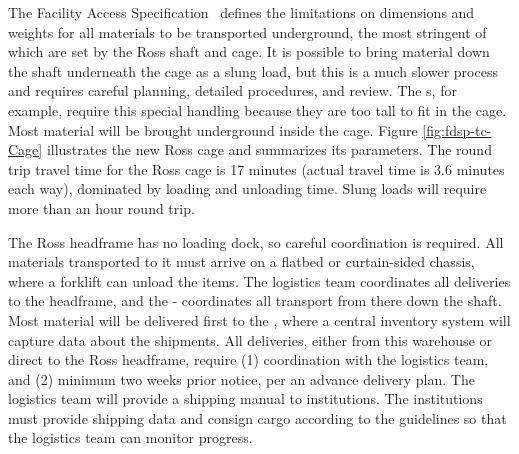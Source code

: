 The  Facility Access Specification~\cite{bib:docdb328} defines the limitations on dimensions and weights for all materials to be transported underground, the most stringent of which are set by the Ross shaft and cage. It is possible to bring material down the shaft underneath the cage as a slung load, but this is a much slower process and requires careful planning, detailed procedures, and review. The  s, for example, require this special handling because they are too tall to fit in the cage. Most material will be brought underground inside the cage. Figure \ref{fig:fdsp-tc-Cage} illustrates the new Ross cage and summarizes its parameters.  The round trip travel time for the Ross cage is 17 minutes (actual travel time is \num{3.6} minutes each way), dominated by loading and unloading time.  Slung loads will require more than an hour round trip.


The Ross headframe has no loading dock, so careful coordination is required. All materials transported to it must arrive on a flatbed or curtain-sided chassis, where a forklift can unload  the items. The logistics team coordinates all deliveries to the headframe, and the - coordinates all transport from there down the shaft.  Most material will be delivered first to the , where a central inventory system will capture data about the shipments.  All deliveries, either from this warehouse or direct to the Ross headframe, require (1) coordination with the logistics team, and (2) minimum two weeks prior notice, per an advance delivery plan.  The logistics team will provide a shipping manual  to  institutions. The institutions must provide shipping data and consign cargo according to the guidelines so that the logistics team can monitor progress. 



